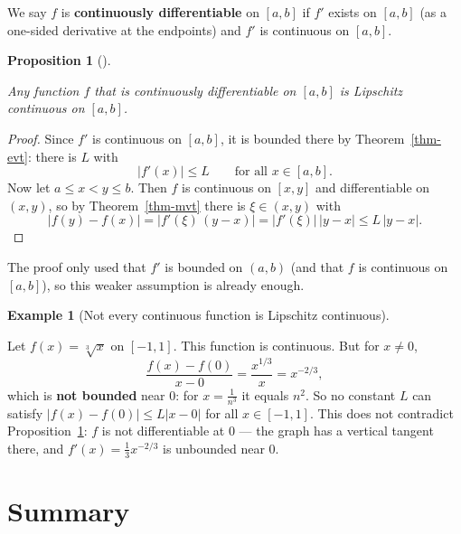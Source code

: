 \documentclass[
  letterpaper,
  DIV=11,
  numbers=noendperiod]{scrreprt}
\theoremstyle{plain}
\theoremstyle{plain}
\newtheorem{proposition}{Proposition}[chapter]
\theoremstyle{definition}
\theoremstyle{definition}
\theoremstyle{definition}
\newtheorem{example}{Example}[chapter]
\theoremstyle{plain}
\theoremstyle{plain}
\theoremstyle{remark}
\begin{document}
We say \(f\) is \textbf{continuously differentiable} on \([a,b]\) if
\(f'\) exists on \([a,b]\) (as a one-sided derivative at the endpoints)
and \(f'\) is continuous on \([a,b]\).

\begin{proposition}[]\protect\hypertarget{prp-c1-lipschitz}{}\label{prp-c1-lipschitz}

\hfill\break
Any function \(f\) that is continuously differentiable on \([a,b]\) is
Lipschitz continuous on \([a,b]\).

\end{proposition}

\begin{proof}
Since \(f'\) is continuous on \([a,b]\), it is bounded there by
Theorem~\ref{thm-evt}: there is \(L\) with \[
\lvert f'(x) \rvert \le L \qquad\text{for all } x\in[a,b].
\] Now let \(a\le x<y\le b\). Then \(f\) is continuous on \([x,y]\) and
differentiable on \((x,y)\), so by Theorem~\ref{thm-mvt} there is
\(\xi\in(x,y)\) with \[
\lvert f(y)-f(x) \rvert = \lvert f'(\xi)\,(y-x) \rvert = \lvert f'(\xi) \rvert\,\lvert y-x \rvert \le L\,\lvert y-x \rvert .
\]
\end{proof}

The proof only used that \(f'\) is bounded on \((a,b)\) (and that \(f\)
is continuous on \([a,b]\)), so this weaker assumption is already
enough.

\begin{example}[Not every continuous function is Lipschitz
continuous]\protect\hypertarget{exm-cube-root-not-lipschitz}{}\label{exm-cube-root-not-lipschitz}

\hfill\break
Let \(f(x) = \sqrt[3]{x}\) on \([-1,1]\). This function is continuous.
But for \(x\neq0\), \[
\frac{f(x)-f(0)}{x-0} = \frac{x^{1/3}}{x} = x^{-2/3},
\] which is \textbf{not bounded} near \(0\): for \(x = \frac1{n^3}\) it
equals \(n^2\). So no constant \(L\) can satisfy
\(\lvert f(x)-f(0) \rvert\le L\lvert x-0 \rvert\) for all
\(x\in[-1,1]\). This does not contradict
Proposition~\ref{prp-c1-lipschitz}: \(f\) is not differentiable at \(0\)
--- the graph has a vertical tangent there, and
\(f'(x) = \frac13 x^{-2/3}\) is unbounded near \(0\).

\end{example}

\section{Summary}\label{summary-11}
\end{document}
